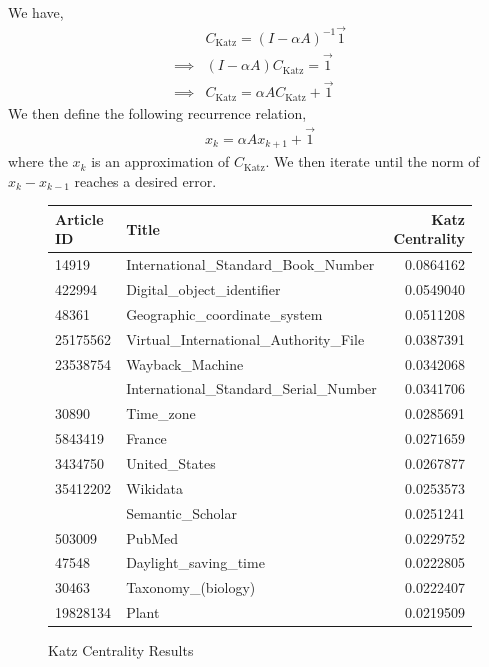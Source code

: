 \documentclass{article}
\begin{document}
We have,
\begin{align*}
    & C_{\textrm{Katz}} = (I - \alpha A)^{-1} \overrightarrow{1} \\
    \implies & (I - \alpha A) C_{\textrm{Katz}} = \overrightarrow{1} \\
    \implies & C_{\textrm{Katz}} = \alpha A C_{\textrm{Katz}} + \overrightarrow{1}
\end{align*}
We then define the following recurrence relation,
\begin{align*}
    x_k = \alpha A x_{k+1} + \overrightarrow{1}
\end{align*} where the $x_k$ is an approximation of $C_{\textrm{Katz}}$. We then iterate until the norm of $x_{k} - x_{k-1}$ reaches a desired error.

\begin{figure}[H]
    \centering
    \caption{Katz Centrality Results}
    \begin{tabular}{llr}
        \toprule
        Article ID & Title & Katz Centrality\\
        \midrule
        14919 & International\_Standard\_Book\_Number & 0.0864162\\
        422994 & Digital\_object\_identifier & 0.0549040\\
        48361 & Geographic\_coordinate\_system & 0.0511208\\
        25175562 & Virtual\_International\_Authority\_File & 0.0387391\\
    23538754 & Wayback\_Machine & 0.0342068\\
    \addlinespace
    234930 & International\_Standard\_Serial\_Number & 0.0341706\\
    30890 & Time\_zone & 0.0285691\\
    5843419 & France & 0.0271659\\
    3434750 & United\_States & 0.0267877\\
    35412202 & Wikidata & 0.0253573\\
    \addlinespace
    48455863 & Semantic\_Scholar & 0.0251241\\
    503009 & PubMed & 0.0229752\\
    47548 & Daylight\_saving\_time & 0.0222805\\
    30463 & Taxonomy\_(biology) & 0.0222407\\
    19828134 & Plant & 0.0219509\\
    \bottomrule
    \end{tabular}
\end{figure}
\end{document}
